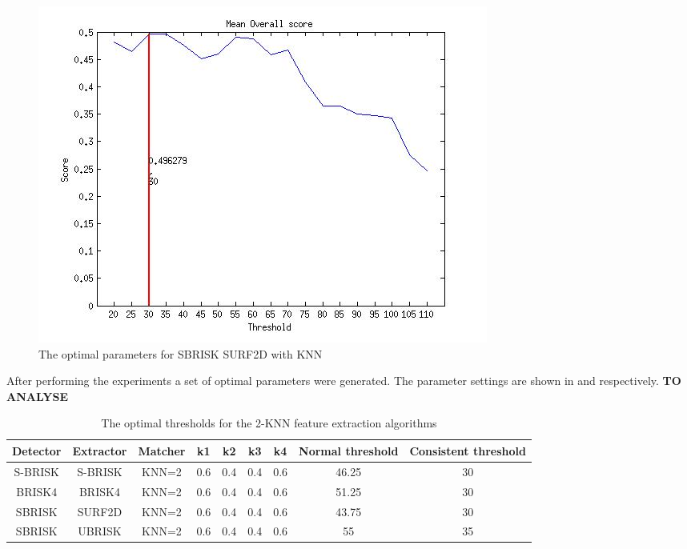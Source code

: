\documentclass{article}
\begin{document}
\begin{figure}[h!]
\begin{minipage}[b]{0.5\linewidth}
\includegraphics[scale=0.5]{../Drawings/OptimalParameters_SBRISK_SURF2D_KNN.jpg}
\caption{The optimal parameters for SBRISK SURF2D with KNN}
\label{fig:sbrisksurfknnOptimal}
\end{minipage}
\end{figure}

After performing the experiments a set of optimal parameters were generated. The parameter settings are shown in  and  respectively. \textbf{TO ANALYSE}\\



\begin{table}
\caption{The optimal thresholds for the 2-KNN feature extraction algorithms}
\begin{tabular}{|c|c|c|c|c|c|c|c|c|}
\hline 
Detector & Extractor & Matcher & k1 & k2 & k3 & k4 & Normal threshold & Consistent threshold\tabularnewline
\hline 
\hline 
S-BRISK & S-BRISK & KNN=2 & 0.6 & 0.4 & 0.4 & 0.6 & 46.25 & 30\tabularnewline
\hline 
BRISK4 & BRISK4 & KNN=2 & 0.6 & 0.4 & 0.4 & 0.6 & 51.25 & 30\tabularnewline
\hline 
SBRISK & SURF2D & KNN=2 & 0.6 & 0.4 & 0.4 & 0.6 & 43.75 & 30\tabularnewline
\hline 
SBRISK & UBRISK & KNN=2 & 0.6 & 0.4 & 0.4 & 0.6 & 55 & 35\tabularnewline
\hline 
\end{tabular}
\label{tab:knnStatistics}
\end{table}
\end{document}
